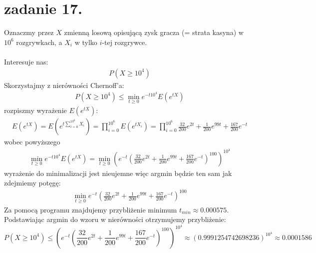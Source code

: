 \documentclass{article}
\begin{document}
\section{zadanie 17.}
Oznaczmy przez $X$ zmienną losową opisującą zysk gracza (= strata kasyna) w $10^6$ rozgrywkach, a $X_i$ w tylko $i$-tej rozgrywce.\\\\
Interesuje nas:
\begin{align}
P(X \geq 10^4)
\end{align}
Skorzystajmy z nierówności Chernoff'a:
\begin{align}
P(X \geq 10^4) \leq \min_{t\geq 0} e^{-t10^4} E(e^{tX})
\end{align}
rozpiszmy wyrażenie $E(e^{tX})$:
\begin{align}
E(e^{tX}) = E\left(e^{t\sum_{i=0}^{10^6}X_i}\right) = \prod_{i=0}^{10^6}E(e^{tX_i}) = \prod_{i=0}^{10^6} \frac{32}{200}e^{2t}+\frac{1}{200}e^{99t} + \frac{167}{200}e^{-t}
\end{align}
wobec powyższego
\begin{align}
\min_{t\geq 0} e^{-t10^4} E(e^{tX}) = \min_{t\geq 0} \left(e^{-t} \left(\frac{32}{200}e^{2t}+\frac{1}{200}e^{99t} + \frac{167}{200}e^{-t}\right)^{100}\right)^{10^4}
\end{align}
wyrażenie do minimalizacji jest nieujemne więc argmin będzie ten sam jak zdejmiemy potęgę:
\begin{align}
\min_{t\geq 0} e^{-t} \left(\frac{32}{200}e^{2t}+\frac{1}{200}e^{99t} + \frac{167}{200}e^{-t}\right)^{100}
\end{align}
Za pomocą programu znajdujemy przybliżenie minimum $t_{min} \approx 0.000575$.\\
Podstawiając argmin do wzoru w nierówności otrzymujemy przybliżenie:
$$
P(X \geq 10^4) \leq \left(e^{-t} \left(\frac{32}{200}e^{2t}+\frac{1}{200}e^{99t} + \frac{167}{200}e^{-t}\right)^{100}\right)^{10^4} \approx (0.9991254742698236)^{10^4} \approx 0.0001586
$$

\clearpage
\end{document}
